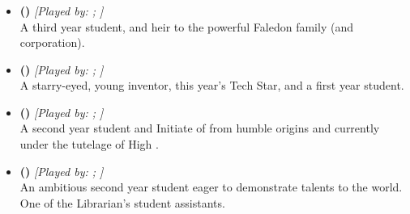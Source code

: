 \documentclass[blue]{GL2020}
\begin{document}
\subsubsection*{\pTech{}}
\begin{itemize}
    \item \textbf{\cHeir{\full} (\cHeir{\MYcharpronouns})} \textit{[Played by: \cHeir{\MYplayer}; \cHeir{\MYplayerpronouns}]}\\ A third year student, and heir to the powerful Faledon family (and corporation).

    \item \textbf{\cTechStar{\full} (\cTechStar{\MYcharpronouns})} \textit{[Played by: \cTechStar{\MYplayer}; \cTechStar{\MYplayerpronouns}]}\\ A starry-eyed, young inventor, this year's Tech Star, and a first year student.

    \item \textbf{\cScholarship{\full} (\cScholarship{\MYcharpronouns})} \textit{[Played by: \cScholarship{\MYplayer}; \cScholarship{\MYplayerpronouns}]}\\ A second year student and Initiate of \cTechGod{} from humble origins and currently under the tutelage of High \cAntiChup{\Cleric} \cAntiChup{}.

    \item \textbf{\cAmbition{\full} (\cAmbition{\MYcharpronouns})} \textit{[Played by: \cAmbition{\MYplayer}; \cAmbition{\MYplayerpronouns}]}\\ An ambitious second year student eager to demonstrate \cAmbition{\their} talents to the world. One of the Librarian's student assistants.
    
\end{itemize}
\end{document}
